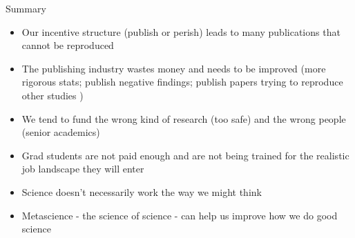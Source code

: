 \documentclass{beamer}
\begin{document}
\begin{frame}{Summary}
	\begin{itemize}
		\item Our incentive structure (publish or perish) leads to many publications that cannot be reproduced
		\item<2-> The publishing industry wastes money and needs to be improved (more rigorous stats; publish negative findings; publish papers trying to reproduce other studies )
		\item<3-> We tend to fund the wrong kind of research (too safe) and the wrong people (senior academics)
		\item<4-> Grad students are not paid enough and are not being trained for the realistic job landscape they will enter
		\item<5-> Science doesn't necessarily work the way we might think
		\item<6-> Metascience - the science of science - can help us improve how we do good science
	\end{itemize}
	
\end{frame}
\end{document}
